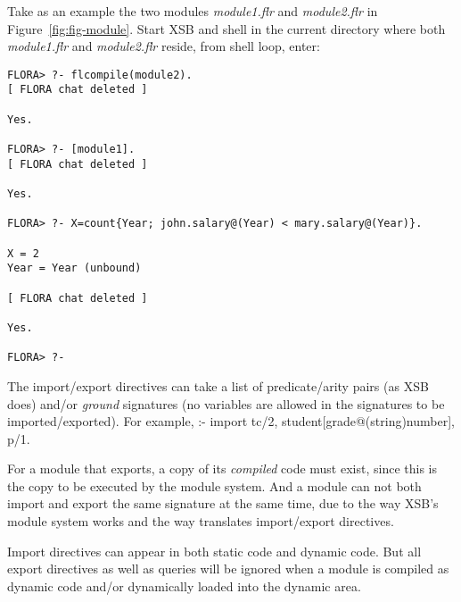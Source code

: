 \documentclass[11pt]{report}
\begin{document}
Take as an example the two \FLORA modules \emph{module1.flr} and \emph{module2.flr} in
Figure~\ref{fig:fig-module}. Start XSB and \FLORA shell in the current directory where
both \emph{module1.flr} and \emph{module2.flr} reside, from \FLORA shell loop, enter:
\begin{verbatim}
FLORA> ?- flcompile(module2).
[ FLORA chat deleted ]

Yes.

FLORA> ?- [module1].
[ FLORA chat deleted ]

Yes.

FLORA> ?- X=count{Year; john.salary@(Year) < mary.salary@(Year)}.

X = 2
Year = Year (unbound)

[ FLORA chat deleted ]

Yes.

FLORA> ?-
\end{verbatim}

The import/export directives can take a list of predicate/arity pairs (as XSB does) and/or
\emph{ground} \fl signatures (no variables are allowed in the signatures to be
imported/exported). For example, :- import tc/2, student[grade@(string){\Fd}number], p/1.

For a \FLORA module that exports, a copy of its \emph{compiled} code must exist, since this is
the copy to be executed by the module system. And a \FLORA module can not both import and
export the same \fl signature at the same time, due to the way XSB's module system works and
the way \FLORA translates import/export directives.

Import directives can appear in both static code and dynamic code. But all export directives
as well as queries will be ignored when a \FLORA module is compiled as dynamic code and/or
dynamically loaded into the dynamic area.
\end{document}
